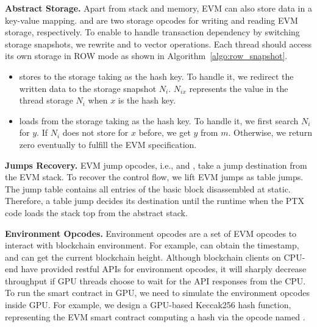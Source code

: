 \noindent\textbf{Abstract Storage.}
Apart from stack and memory, EVM can also store data in a key-value mapping. 
 and  are two storage opcodes for writing and reading EVM storage, respectively.
To enable {\tool} to handle transaction dependency by switching storage snapshots, we rewrite  and  to vector operations. 
Each thread should access its own storage in ROW mode as shown in Algorithm~\ref{algo:row_snapshot}.
%
\begin{itemize}
    \item {} stores  to the storage taking  as the hash key. To handle it, we redirect the written data to the storage snapshot $N_i$. $N_{ix}$ represents the value in the thread storage $N_i$ when $x$ is the hash key.
    
    \item {} loads  from the storage taking  as the hash key. To handle it, we first search $N_i$ for $y$. If $N_i$ does not store for $x$ before, we get $y$ from $m$. Otherwise, we return zero eventually to fulfill the EVM specification.
\end{itemize}

\noindent\textbf{Jumps Recovery.}
EVM jump opcodes, i.e.,  and , take a jump destination from the EVM stack. 
To recover the control flow, we lift EVM jumps as table jumps. 
The jump table contains all entries of the basic block disassembled at static.
Therefore, a table jump decides its destination until the runtime when the PTX code loads the stack top from the abstract stack.


\noindent\textbf{Environment Opcodes.}
Environment opcodes are a set of EVM opcodes to interact with blockchain environment\cite{evm2021opcodes}.
For example,  can obtain the timestamp, and  can get the current blockchain height. 
%
Although blockchain clients on CPU-end have provided restful APIs for environment opcodes, it will sharply decrease {\tool} throughput if GPU threads choose to wait for the API responses from the CPU.
%
To run the smart contract in GPU, we need to simulate the environment opcodes inside GPU.
For example, we design a GPU-based Keccak256\cite{bertoni2013keccak} hash function, representing the EVM smart contract computing a hash via the opcode named .


